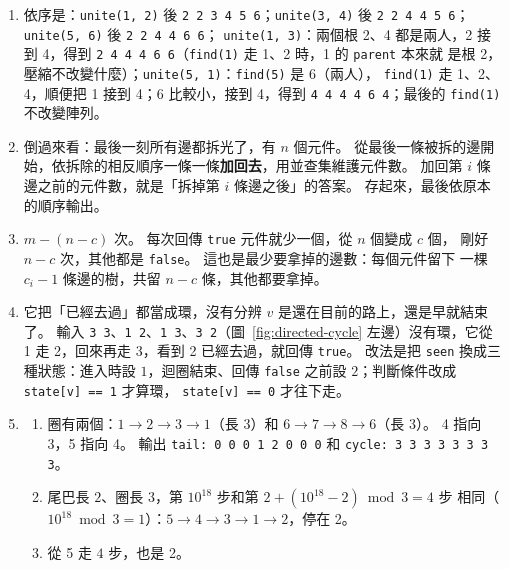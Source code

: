 \begin{enumerate}
\item 依序是：\texttt{unite(1, 2)} 後 \texttt{2 2 3 4 5 6}；\texttt{unite(3, 4)}
後 \texttt{2 2 4 4 5 6}；\texttt{unite(5, 6)} 後 \texttt{2 2 4 4 6 6}；
\texttt{unite(1, 3)}：兩個根 2、4 都是兩人，2 接到 4，得到
\texttt{2 4 4 4 6 6}（\texttt{find(1)} 走 1、2 時，1 的 \texttt{parent} 本來就
是根 2，壓縮不改變什麼）；\texttt{unite(5, 1)}：\texttt{find(5)} 是 6（兩人），
\texttt{find(1)} 走 1、2、4，順便把 1 接到 4；6 比較小，接到 4，得到
\texttt{4 4 4 4 6 4}；最後的 \texttt{find(1)} 不改變陣列。

\item 倒過來看：最後一刻所有邊都拆光了，有 $n$ 個元件。 從最後一條被拆的邊開
始，依拆除的相反順序一條一條\textbf{加回去}，用並查集維護元件數。 加回第 $i$ 條
邊之前的元件數，就是「拆掉第 $i$ 條邊之後」的答案。 存起來，最後依原本的順序輸出。

\item $m - (n - c)$ 次。 每次回傳 \texttt{true} 元件就少一個，從 $n$ 個變成 $c$ 個，
剛好 $n - c$ 次，其他都是 \texttt{false}。 這也是最少要拿掉的邊數：每個元件留下
一棵 $c_i - 1$ 條邊的樹，共留 $n - c$ 條，其他都要拿掉。

\item 它把「已經去過」都當成環，沒有分辨 $v$ 是還在目前的路上，還是早就結束了。
輸入 \texttt{3 3}、\texttt{1 2}、\texttt{1 3}、\texttt{3 2}（圖~\ref{fig:directed-cycle}
左邊）沒有環，它從 1 走 2，回來再走 3，看到 2 已經去過，就回傳 \texttt{true}。
改法是把 \texttt{seen} 換成三種狀態：進入時設 $1$，迴圈結束、回傳
\texttt{false} 之前設 $2$；判斷條件改成 \texttt{state[v] == 1} 才算環，
\texttt{state[v] == 0} 才往下走。

\item
\begin{enumerate}
\item 圈有兩個：$1 \to 2 \to 3 \to 1$（長 $3$）和 $6 \to 7 \to 8 \to 6$（長 $3$）。
4 指向 3，5 指向 4。 輸出
\texttt{tail: 0 0 0 1 2 0 0 0} 和 \texttt{cycle: 3 3 3 3 3 3 3 3}。
\item 尾巴長 $2$、圈長 $3$，第 $10^{18}$ 步和第 $2 + (10^{18} - 2) \bmod 3 = 4$ 步
相同（$10^{18} \bmod 3 = 1$）：$5 \to 4 \to 3 \to 1 \to 2$，停在 2。
\item 從 5 走 $4$ 步，也是 2。
\end{enumerate}
\end{enumerate}
